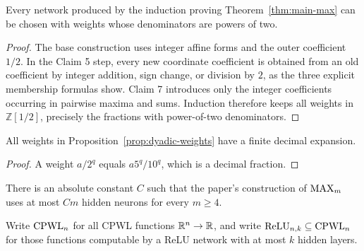 \begin{proposition}
  \label{prop:dyadic-weights}
  Every network produced by the induction proving Theorem~\ref{thm:main-max}
  can be chosen with weights whose denominators are powers of two.
\end{proposition}
\begin{proof}
  The base construction uses integer affine forms and the outer coefficient
  $1/2$.  In the Claim 5 step, every new coordinate coefficient is obtained
  from an old coefficient by integer addition, sign change, or division by
  $2$, as the three explicit membership formulas show.  Claim 7 introduces
  only the integer coefficients occurring in pairwise maxima and sums.
  Induction therefore keeps all weights in $\mathbb Z[1/2]$, precisely the
  fractions with power-of-two denominators.
\end{proof}

\begin{corollary}
  \label{cor:dyadic-decimal}
  All weights in Proposition~\ref{prop:dyadic-weights} have a finite decimal
  expansion.
\end{corollary}
\begin{proof}
  A weight $a/2^q$ equals $a5^q/10^q$, which is a decimal fraction.
\end{proof}

\begin{proposition}
  \label{prop:linear-size}
  \notready
  There is an absolute constant $C$ such that the paper's construction of
  $\operatorname{MAX}_m$ uses at most $Cm$ hidden neurons for every $m\geq4$.
\end{proposition}

\begin{definition}
  \label{def:depth-classes}
  Write $\operatorname{CPWL}_n$ for all CPWL functions $\mathbb{R}^n\to\mathbb{R}$, and write
  $\operatorname{ReLU}_{n,k}\subseteq\operatorname{CPWL}_n$ for those functions computable by a ReLU
  network with at most $k$ hidden layers.
\end{definition}

